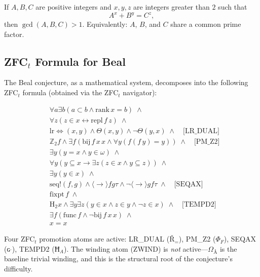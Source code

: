 \documentclass[12pt]{article}
\begin{document}
\begin{definition}
If $A,B,C$ are positive integers and $x,y,z$ are integers greater than
$2$ such that
\begin{equation}\label{eq:beal}
A^x + B^y = C^z,
\end{equation}
then $\gcd(A,B,C) > 1$. Equivalently: $A$, $B$, and $C$ share a common
prime factor.
\end{definition}

\subsection{ZFC${}_t$ Formula for Beal}

The Beal conjecture, as a mathematical system, decomposes into the
following ZFC${}_t$ formula (obtained via the ZFC${}_t$ navigator):

\begin{equation}\label{eq:beal_zfc}
\begin{aligned}
&\forall a\exists b(a\subset b \land \text{rank}\,x=b) \;\land \\[-2pt]
&\forall z(z\in x \leftrightarrow \text{repl}\,f\,z) \;\land \\[-2pt]
&\text{lr}{\Leftrightarrow}(x,y) \land \Theta(x,y) \land \lnot\Theta(y,x)
   \;\land \quad\text{[LR\_DUAL]} \\[-2pt]
&\mathbb{Z}_2 f \land \exists f(\text{bij}\,f\,x\,x \land
   \forall y(f(f\,y)=y)) \;\land \quad\text{[PM\_Z2]} \\[-2pt]
&\exists y(y=x \land y\in\omega) \;\land \\[-2pt]
&\forall y(y\subseteq x \to \exists z(z\in x \land y\subseteq z)) \;\land \\[-2pt]
&\exists y(y\in x) \;\land \\[-2pt]
&\text{seq!}(f,g) \land \langle\to\rangle f g \tau \land
   \lnot\langle\to\rangle g f \tau \;\land \quad\text{[SEQAX]} \\[-2pt]
&\text{fixpt}\,f \;\land \\[-2pt]
&\text{H}_2 x \land \exists y\exists z(y\in x \land z\in y \land
   \lnot z\in x) \;\land \quad\text{[TEMPD2]} \\[-2pt]
&\exists f(\text{func}\,f \land \lnot\text{bij}\,f\,x\,x) \;\land \\[-2pt]
&x=x
\end{aligned}
\end{equation}

Four ZFC${}_t$ promotion atoms are active: LR\_DUAL ($\text{Ř}_=$),
PM\_Z2 ($\Phi_F$), SEQAX ($\text{ɢ}^{ˌ}$), TEMPD2 ($\text{Ħ}_A$).
The winding atom (ZWIND) is \emph{not} active---$\Omega_{\text{Å}}$
is the baseline trivial winding, and this is the structural root of
the conjecture's difficulty.
\end{document}
